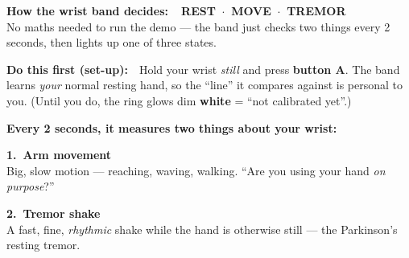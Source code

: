 \documentclass[11pt]{article}
\begin{document}
\begin{tcolorbox}[enhanced, colback=teal, colframe=teal, arc=4pt, boxrule=0pt,
  left=14pt, right=14pt, top=9pt, bottom=9pt]
  {\color{white}\huge\bfseries How the wrist band decides:\ \ REST\, $\cdot$\, MOVE\, $\cdot$\, TREMOR}\\[3pt]
  {\color{tealbg}\normalsize No maths needed to run the demo — the band just checks two things every 2 seconds, then lights up one of three states.}
\end{tcolorbox}

\vspace{5pt}

\begin{tcolorbox}[enhanced, colback=amberbg, frame hidden,
  borderline west={3pt}{0pt}{amber}, arc=2pt, left=10pt, right=10pt, top=5pt, bottom=5pt]
  {\bfseries\color{amber!85!black}Do this first (set-up):}\ \ Hold your wrist
  \emph{still} and press \textbf{button A}. The band learns \emph{your} normal
  resting hand, so the ``line'' it compares against is personal to you. (Until
  you do, the ring glows dim \textbf{white} = ``not calibrated yet''.)
\end{tcolorbox}

\vspace{6pt}

{\large\bfseries Every 2 seconds, it measures two things about your wrist:}\\[5pt]

\begin{tcbraster}[raster columns=2, raster column skip=6mm, raster equal height,
  enhanced, colback=tealbg, frame hidden, borderline west={3pt}{0pt}{teal},
  arc=2pt, left=10pt, right=10pt, top=6pt, bottom=6pt]
  \begin{tcolorbox}
    {\bfseries\color{teal} 1.\ Arm movement}\\[2pt]
    Big, slow motion --- reaching, waving, walking. ``Are you using your hand
    \emph{on purpose}?''
  \end{tcolorbox}
  \begin{tcolorbox}
    {\bfseries\color{teal} 2.\ Tremor shake}\\[2pt]
    A fast, fine, \emph{rhythmic} shake while the hand is otherwise still ---
    the Parkinson's resting tremor.
  \end{tcolorbox}
\end{tcbraster}
\end{document}
